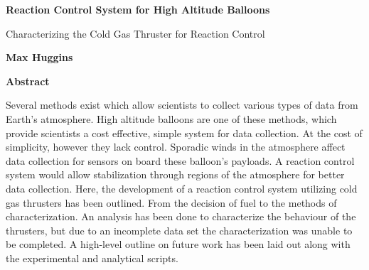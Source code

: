 \thispagestyle{plain}
\begin{center}
    \large
    \textbf{Reaction Control System for High Altitude Balloons}
        
    \vspace{0.4cm}
    \normalsize
    Characterizing the Cold Gas Thruster for Reaction Control
        
    \vspace{0.4cm}
    \textbf{Max Huggins}
       
    \vspace{0.9cm}
    \textbf{Abstract}
\end{center}
Several methods exist which allow scientists to collect various types of data from Earth's atmosphere. High altitude balloons are one of these methods, which provide scientists a cost effective, simple system for data collection. At the cost of simplicity, however they lack control. Sporadic winds in the atmosphere affect data collection for sensors on board these balloon's payloads. A reaction control system would allow stabilization through regions of the atmosphere for better data collection. Here, the development of a reaction control system utilizing cold gas thrusters has been outlined. From the decision of fuel to the methods of characterization. An analysis has been done to characterize the behaviour of the thrusters, but due to an incomplete data set the characterization was unable to be completed. A high-level outline on future work has been laid out along with the experimental and analytical scripts.